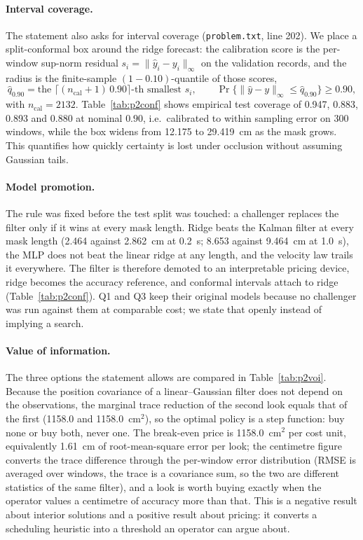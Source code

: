 \documentclass{swmcmthesis}
\begin{document}
\paragraph{Interval coverage.} The statement also asks for interval coverage (\texttt{problem.txt}, line 202). We place a split-conformal box around the ridge forecast: the calibration score is the per-window sup-norm residual $s_i=\|\hat y_i-y_i\|_\infty$ on the validation records, and the radius is the finite-sample $(1-0.10)$-quantile of those scores,
\begin{equation}
\hat q_{0.90}=\text{the } \bigl\lceil (n_{\mathrm{cal}}+1)\,0.90\bigr\rceil\text{-th smallest } s_i, \qquad \Pr\{\|\hat y-y\|_\infty\le \hat q_{0.90}\}\ge 0.90,
\end{equation}
with $n_{\mathrm{cal}}=2132$. Table~\ref{tab:p2conf} shows empirical test coverage of 0.947, 0.883, 0.893 and 0.880 at nominal $0.90$, i.e.\ calibrated to within sampling error on 300 windows, while the box widens from 12.175 to 29.419~cm as the mask grows. This quantifies how quickly certainty is lost under occlusion without assuming Gaussian tails.


\paragraph{Model promotion.} The rule was fixed before the test split was touched: a challenger replaces the filter only if it wins at every mask length. Ridge beats the Kalman filter at every mask length (2.464 against 2.862~cm at 0.2~s; 8.653 against 9.464~cm at 1.0~s), the MLP does not beat the linear ridge at any length, and the velocity law trails it everywhere. The filter is therefore demoted to an interpretable pricing device, ridge becomes the accuracy reference, and conformal intervals attach to ridge (Table~\ref{tab:p2conf}). Q1 and Q3 keep their original models because no challenger was run against them at comparable cost; we state that openly instead of implying a search.

\paragraph{Value of information.} The three options the statement allows are compared in Table~\ref{tab:p2voi}. Because the position covariance of a linear--Gaussian filter does not depend on the observations, the marginal trace reduction of the second look equals that of the first (1158.0 and 1158.0~cm$^2$), so the optimal policy is a step function: buy none or buy both, never one. The break-even price is 1158.0~cm$^2$ per cost unit, equivalently 1.61~cm of root-mean-square error per look; the centimetre figure converts the trace difference through the per-window error distribution (RMSE is averaged over windows, the trace is a covariance sum, so the two are different statistics of the same filter), and a look is worth buying exactly when the operator values a centimetre of accuracy more than that. This is a negative result about interior solutions and a positive result about pricing: it converts a scheduling heuristic into a threshold an operator can argue about.
\end{document}
